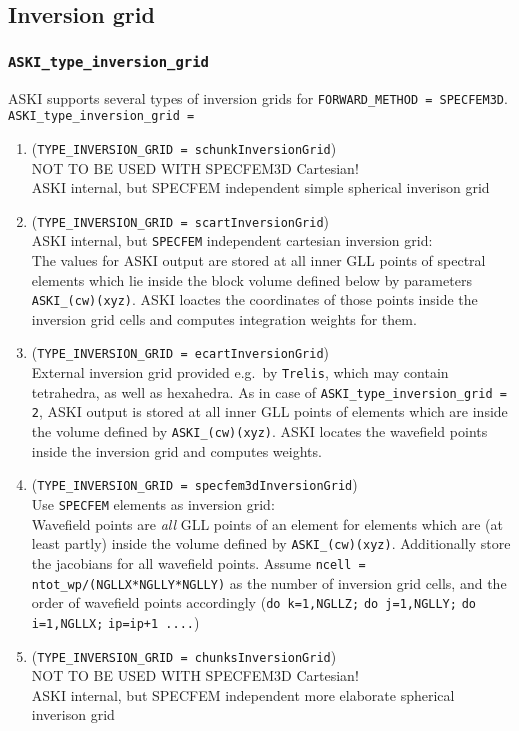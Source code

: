 \documentclass[12pt,a4paper]{article}
\newcommand{\lcode}[1]{\nolinkurl{#1}}
\newcommand{\ASKI}{ {\ttfamily ASKI} }
\begin{document}
\subsection{Inversion grid}
\subsubsection*{\lcode{ASKI_type_inversion_grid}}
ASKI supports several types of inversion grids for \lcode{FORWARD_METHOD = SPECFEM3D}.
\lcode{ASKI_type_inversion_grid = }
\begin{enumerate}
\item (\lcode{TYPE_INVERSION_GRID = schunkInversionGrid}) \\ 
  NOT TO BE USED WITH SPECFEM3D Cartesian!\\
  ASKI internal, but SPECFEM independent simple spherical inverison grid
\item (\lcode{TYPE_INVERSION_GRID = scartInversionGrid})\\
  \ASKI internal, but \lcode{SPECFEM} independent cartesian inversion grid:\\
  The values for \ASKI output are stored at all inner GLL points of spectral elements which lie
  inside the block volume defined below by parameters \lcode{ASKI_(cw)(xyz)}.
  \ASKI loactes the coordinates of those points inside the inversion grid cells and computes
  integration weights for them.
\item (\lcode{TYPE_INVERSION_GRID = ecartInversionGrid}) \\
  External inversion grid provided e.g.\ by \lcode{Trelis}, which may contain tetrahedra, as well as hexahedra.
  As in case of \lcode{ASKI_type_inversion_grid = 2}, \ASKI output is stored at all inner GLL points of elements
  which are inside the volume defined by \lcode{ASKI_(cw)(xyz)}.
  \ASKI locates the wavefield points inside the inversion grid and computes weights.
\item (\lcode{TYPE_INVERSION_GRID = specfem3dInversionGrid}) \\
  Use \lcode{SPECFEM} elements as inversion grid:\\
  Wavefield points are \emph{all} GLL points of an element for elements which are (at least partly) inside the 
  volume defined by \lcode{ASKI_(cw)(xyz)}. Additionally store the jacobians for all wavefield points.
  Assume \lcode{ncell = ntot_wp/(NGLLX*NGLLY*NGLLY)} as the number of inversion grid cells, and the order of 
  wavefield points accordingly (\lcode{do k=1,NGLLZ;} \lcode{do j=1,NGLLY;} \lcode{do i=1,NGLLX;} \lcode{ip=ip+1 ....})
\item (\lcode{TYPE_INVERSION_GRID = chunksInversionGrid}) \\ 
  NOT TO BE USED WITH SPECFEM3D Cartesian!\\
  ASKI internal, but SPECFEM independent more elaborate spherical inverison grid
\end{enumerate}
\end{document}
